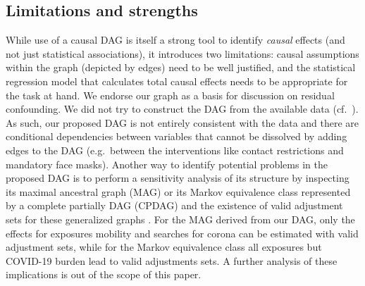 \documentclass[10pt,letterpaper]{article}
\providecommand{\DIFaddend}{} %
\DeclareRobustCommand{\DIFaddend}{\DIFOaddend \let\includegraphics\DIFOincludegraphics} %
\begin{document}
\DIFaddend \subsection*{Limitations and strengths}\label{limitations-and-strengths}

While use of a causal DAG is itself a strong tool to identify \emph{causal} effects (and not just statistical associations), it introduces two limitations: causal assumptions within the graph (depicted by edges) need to be well justified, and the statistical regression model that calculates total causal effects needs to be appropriate for the task at hand. We endorse our graph as a basis for discussion on residual confounding. We did not try to construct the DAG from the available data (cf.~\cite{gencoglu2020causal}). As such, our proposed DAG is not entirely consistent with the data and there are conditional dependencies between variables that cannot be dissolved by adding edges to the DAG (e.g.~between the interventions like contact restrictions and mandatory face masks). Another way to identify potential problems in the proposed DAG is to perform a sensitivity analysis of its structure by inspecting its maximal ancestral graph (MAG) or its Markov equivalence class represented by a complete partially DAG (CPDAG) and the existence of valid adjustment sets for these generalized graphs \cite{perkovic2017complete}. For the MAG derived from our DAG, only the effects for exposures mobility and searches for corona can be estimated with valid adjustment sets, while for the Markov equivalence class all exposures but COVID-19 burden lead to valid adjustments sets. A further analysis of these implications is out of the scope of this paper.
\end{document}
